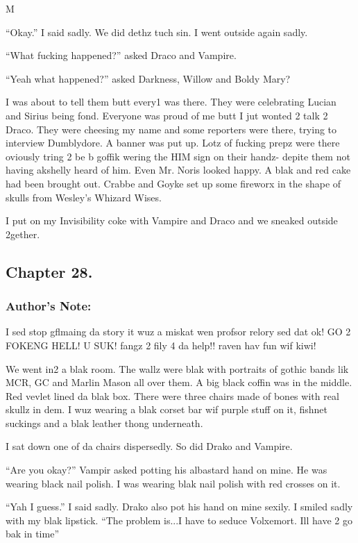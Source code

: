 M\documentclass{article}
\begin{document}
“Okay.” I said sadly. We did dethz tuch sin. I went outside again sadly.

“What fucking happened?” asked Draco and Vampire.

“Yeah what happened?” asked Darkness, Willow and Boldy Mary?

I was about to tell them butt every1 was there. They were celebrating Lucian and Sirius being fond. Everyone was proud of me butt I jut wonted 2 talk 2 Draco. They were cheesing my name and some reporters were there, trying to interview Dumblydore. A banner was put up. Lotz of fucking prepz were there oviously tring 2 be b goffik wering the HIM sign on their handz- depite them not having akshelly heard of him. Even Mr. Noris looked happy. A blak and red cake had been brought out. Crabbe and Goyke set up some fireworx in the shape of skulls from Wesley’s Whizard Wises.

I put on my Invisibility coke with Vampire and Draco and we sneaked outside 2gether.

\clearpage\nolinenumbers
\subsection*{Chapter 28.}

\subsubsection*{Author's Note: }I sed stop gflmaing da story it wuz a miskat wen profsor relory sed dat ok! GO 2 FOKENG HELL! U SUK! fangz 2 fily 4 da help!! raven hav fun wif kiwi!

\textbreak
\linenumbers\resetlinenumber

We went in2 a blak room. The wallz were blak with portraits of gothic bands lik MCR, GC and Marlin Mason all over them. A big black coffin was in the middle. Red vevlet lined da blak box. There were three chairs made of bones with real skullz in dem. I wuz wearing a blak corset bar wif purple stuff on it, fishnet suckings and a blak leather thong underneath.

I sat down one of da chairs dispersedly. So did Drako and Vampire.

“Are you okay?” Vampir asked potting his albastard hand on mine. He was wearing black nail polish. I was wearing blak nail polish with red crosses on it.

“Yah I guess.” I said sadly. Drako also pot his hand on mine sexily. I smiled sadly with my blak lipstick. “The problem is...I have to seduce Volxemort. Ill have 2 go bak in time”
\end{document}
